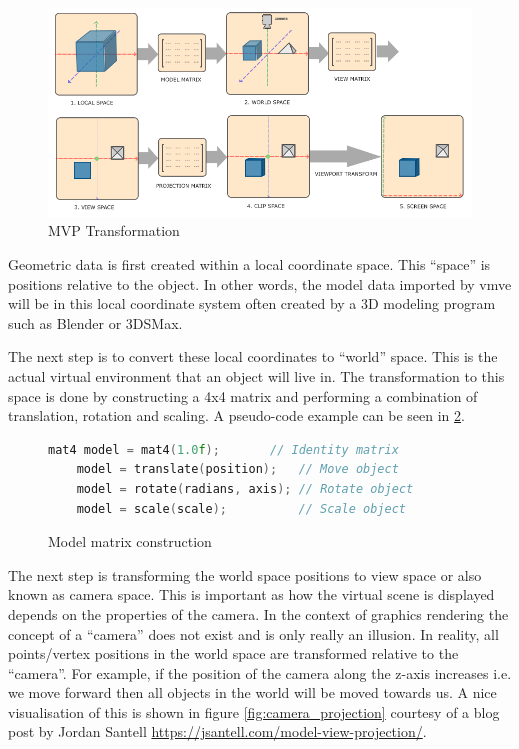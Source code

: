 \documentclass[11pt]{article}
\begin{document}
\begin{figure}[H]
  \centering
  \includegraphics[width=\textwidth]{images/mvp.png}
  \caption{MVP Transformation \cite{coordinate_systems}}
  \label{fig:mvp_transformation} 
\end{figure}

Geometric data is first created within a local coordinate space. This ``space''
is positions relative to the object. In other words, the model data imported by
\gls*{vmve} will be in this local coordinate system often created by a 3D modeling
program such as Blender or 3DSMax.

The next step is to convert these local coordinates to ``world'' space. This is
the actual virtual environment that an object will live in. The transformation
to this space is done by constructing a 4x4 matrix and performing a combination
of translation, rotation and scaling. A pseudo-code example can be seen in
\ref{fig:local_to_world}.

\begin{figure}[H]
  \centering
  \begin{lstlisting}[language=C++]
    mat4 model = mat4(1.0f);       // Identity matrix
    model = translate(position);   // Move object
    model = rotate(radians, axis); // Rotate object
    model = scale(scale);          // Scale object
  \end{lstlisting}
  \caption{Model matrix construction}
  \label{fig:local_to_world}
\end{figure}
  

The next step is transforming the world space positions to view space or also
known as camera space. This is important as how the virtual scene is displayed
depends on the properties of the camera. In the context of graphics rendering
the concept of a ``camera'' does not exist and is only really an illusion. In
reality, all points/vertex positions in the world space are transformed relative
to the ``camera''. For example, if the position of the camera along the z-axis
increases i.e. we move forward then all objects in the world will be moved
towards us. A nice visualisation of this is shown in figure
\ref{fig:camera_projection} courtesy of a blog post by Jordan Santell
\href{https://jsantell.com/model-view-projection/}{https://jsantell.com/model-view-projection/}.
\end{document}

